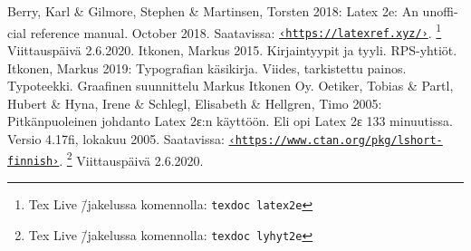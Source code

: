 \documentclass[notitlepage,oneside]{book}
\newcommand{\angleurl}[1]{\href{#1}{\nolinkurl{‹#1›}}}
\newenvironment{teosluettelo}%
{\begin{thebibliography}{99}}%
  {\end{thebibliography}}
\newcommand{\koodi}[1]{\texttt{#1}}
\begin{document}
\begin{teosluettelo}
 Berry, Karl \& Gilmore, Stephen \&
  Martinsen, Torsten 2018: \textenglish{Latex 2e: An unofficial
    reference manual. October 2018.} Saatavissa:
  \angleurl{https://latexref.xyz/}.%
  \footnote{Tex Live \=/jakelussa komennolla: \koodi{texdoc latex2e}}
  Viittauspäivä 2.6.2020.
 Itkonen, Markus 2015. Kirjaintyypit
  ja tyyli. RPS-yhtiöt.
 Itkonen, Markus 2019: Typografian
  käsikirja. Viides, tarkistettu painos. Typoteekki. Graafinen
  suunnittelu Markus Itkonen Oy.
 Oetiker, Tobias \& Partl,
  Hubert \& Hyna, Irene \& Schlegl, Elisabeth \& Hell\-gren, Timo 2005:
  Pitkänpuoleinen johdanto Latex 2ε:n käyttöön. Eli opi Latex 2ε 133
  minuutissa. Versio 4.17fi, lokakuu 2005. Saatavissa:
  \angleurl{https://www.ctan.org/pkg/lshort-finnish}.%
  \footnote{Tex Live \=/jakelussa komennolla: \koodi{texdoc lyhyt2e}}
  Viittauspäivä 2.6.2020.
\end{teosluettelo}

\printindex
\end{document}
